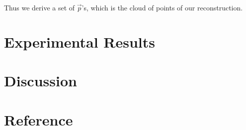 \documentclass[10pt]{article}
\begin{document}
Thus we derive a set of $\vec{p}$'s, which is the cloud of points of our reconstruction. 

\section*{Experimental Results}
\section*{Discussion}
\section*{Reference}
\end{document}
